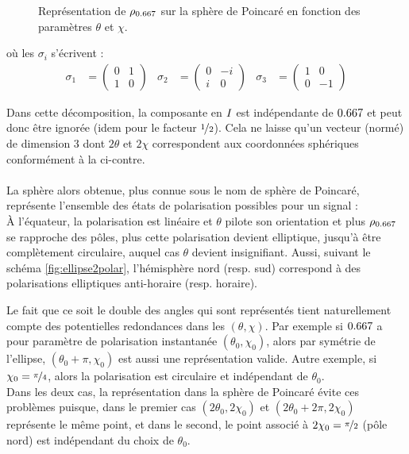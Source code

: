 \begin{figure}
	
	\caption[\DONE Projection sur la sphère de Poincaré]{Représentation de $\rho_{\x}$ sur la sphère de Poincaré en fonction des paramètres $\theta$ et $\chi$.}
	\label{fig:sphere2poincare}
\end{figure}

\par \noindent
où les $\sigma_i$ s'écrivent :
\begin{align*}
	\sigma_1 &= \begin{pmatrix} 0 & 1 \\ 1 &  0 \end{pmatrix}  &
	\sigma_2 &= \begin{pmatrix} 0 & -i \\  i &  0 \end{pmatrix}  &
	\sigma_3 &= \begin{pmatrix} 1 & 0 \\ 0 & -1 \end{pmatrix}
\end{align*}
\skipl

Dans cette décomposition, la composante en $I_{}$ est indépendante de $\x$ et peut donc être ignorée (idem pour le facteur $\nicefrac{1}{2}$). Cela ne laisse qu'un vecteur (normé) de dimension 3 dont $2\theta$ et $2\chi$ correspondent aux coordonnées sphériques conformément à la  ci-contre.
\\ 
\\
La sphère alors obtenue, plus connue sous le nom de sphère de Poincaré, représente l'ensemble des états de polarisation possibles pour un signal :
\\
À l'équateur, la polarisation est linéaire et $\theta$ pilote son orientation et plus $\rho_{\x}$ se rapproche des pôles, plus cette polarisation devient elliptique, jusqu'à être complètement circulaire, auquel cas $\theta$ devient insignifiant. 
Aussi, suivant le schéma \cref{fig:ellipse2polar}, l'hémisphère nord (resp. sud) correspond à des polarisations elliptiques anti-horaire (resp. horaire).

Le fait que ce soit le double des angles qui sont représentés tient naturellement compte des potentielles redondances dans les $(\theta,\chi)$. 
Par exemple si $\x$ a pour paramètre de polarisation instantanée $(\theta_0, \chi_0)$, alors par symétrie de l'ellipse, $(\theta_0+\pi, \chi_0)$ est aussi une représentation valide. Autre exemple, si $\chi_0 = \nicefrac{\pi}{4}$, alors la polarisation est circulaire et indépendant de $\theta_0$.
\\
Dans les deux cas, la représentation dans la sphère de Poincaré évite ces problèmes puisque, dans le premier cas $(2\theta_0, 2\chi_0)$ et $(2\theta_0+2\pi, 2\chi_0)$ représente le même point, et dans le second, le point associé à $2\chi_0=\nicefrac{\pi}{2}$ (pôle nord) est indépendant du choix de $\theta_0$.

